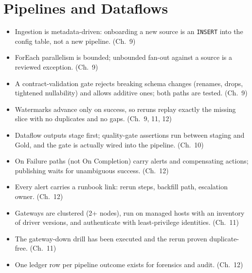 \section{Pipelines and Dataflows}
%
\begin{itemize}
    \item[$\square$] Ingestion is metadata-driven: onboarding a new source is an
    \texttt{INSERT} into the config table, not a new pipeline. (Ch.~9)
    \item[$\square$] ForEach parallelism is bounded; unbounded fan-out against a source is a
    reviewed exception. (Ch.~9)
    \item[$\square$] A contract-validation gate rejects breaking schema changes (renames,
    drops, tightened nullability) and allows additive ones; both paths are tested. (Ch.~9)
    \item[$\square$] Watermarks advance only on success, so reruns replay exactly the missing
    slice with no duplicates and no gaps. (Ch.~9, 11, 12)
    \item[$\square$] Dataflow outputs stage first; quality-gate assertions run between staging
    and Gold, and the gate is actually wired into the pipeline. (Ch.~10)
    \item[$\square$] On Failure paths (not On Completion) carry alerts and compensating
    actions; publishing waits for unambiguous success. (Ch.~12)
    \item[$\square$] Every alert carries a runbook link: rerun steps, backfill path,
    escalation owner. (Ch.~12)
    \item[$\square$] Gateways are clustered (2+ nodes), run on managed hosts with an inventory
    of driver versions, and authenticate with least-privilege identities. (Ch.~11)
    \item[$\square$] The gateway-down drill has been executed and the rerun proven
    duplicate-free. (Ch.~11)
    \item[$\square$] One ledger row per pipeline outcome exists for forensics and audit. (Ch.~12)
\end{itemize}


